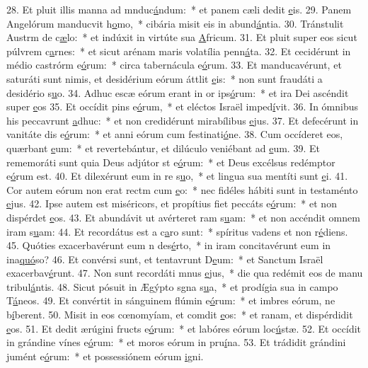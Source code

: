 28. Et pluit illis manna ad mnduc\uline{á}ndum:~* et panem cæli dedit \uline{e}is.
29. Panem Angelórum manducvit h\uline{o}mo,~* cibária misit eis in abund\uline{á}ntia.
30. Tránstulit Austrm de c\uline{æ}lo:~* et indúxit in virtúte sua \uline{A}fricum.
31. Et pluit super eos sicut púlvrem c\uline{a}rnes:~* et sicut arénam maris volatília penn\uline{á}ta.
32. Et cecidérunt in médio castrórm e\uline{ó}rum:~* circa tabernácula e\uline{ó}rum.
33. Et manducavérunt, et saturáti sunt nimis, et desidérium eórum áttlit \uline{e}is:~* non sunt fraudáti a desidério s\uline{u}o.
34. Adhuc escæ eórum erant in or ips\uline{ó}rum:~* et ira Dei ascéndit super \uline{e}os
35. Et occídit pins e\uline{ó}rum,~* et eléctos Israël imped\uline{í}vit.
36. In ómnibus his peccavrunt \uline{a}dhuc:~* et non credidérunt mirabílibus \uline{e}jus.
37. Et defecérunt in vanitáte dis e\uline{ó}rum:~* et anni eórum cum festinati\uline{ó}ne.
38. Cum occíderet eos, quærbant \uline{e}um:~* et revertebántur, et dilúculo veniébant ad \uline{e}um.
39. Et rememoráti sunt quia Deus adjútor st e\uline{ó}rum:~* et Deus excélsus redémptor e\uline{ó}rum est.
40. Et dilexérunt eum in re s\uline{u}o,~* et lingua sua mentíti sunt \uline{e}i.
41. Cor autem eórum non erat rectm cum \uline{e}o:~* nec fidéles hábiti sunt in testaménto \uline{e}jus.
42. Ipse autem est miséricors, et propítius fiet peccáts e\uline{ó}rum:~* et non dispérdet \uline{e}os.
43. Et abundávit ut avérteret ram s\uline{u}am:~* et non accéndit omnem iram s\uline{u}am:
44. Et recordátus est a c\uline{a}ro sunt:~* spíritus vadens et non r\uline{é}diens.
45. Quóties exacerbavérunt eum n des\uline{é}rto,~* in iram concitavérunt eum in ina\uline{quó}so?
46. Et convérsi sunt, et tentavrunt D\uline{e}um:~* et Sanctum Israël exacerbav\uline{é}runt.
47. Non sunt recordáti mnus \uline{e}jus,~* die qua redémit eos de manu tribul\uline{á}ntis.
48. Sicut pósuit in Ægýpto sgna s\uline{u}a,~* et prodígia sua in campo T\uline{á}neos.
49. Et convértit in sánguinem flúmin e\uline{ó}rum:~* et imbres eórum, ne b\uline{í}berent.
50. Misit in eos cœnomyíam, et comdit \uline{e}os:~* et ranam, et dispérdidit \uline{e}os.
51. Et dedit ærúgini fructs e\uline{ó}rum:~* et labóres eórum loc\uline{ú}stæ.
52. Et occídit in grándine vínes e\uline{ó}rum:~* et moros eórum in pru\uline{í}na.
53. Et trádidit grándini jumént e\uline{ó}rum:~* et possessiónem eórum \uline{i}gni.
